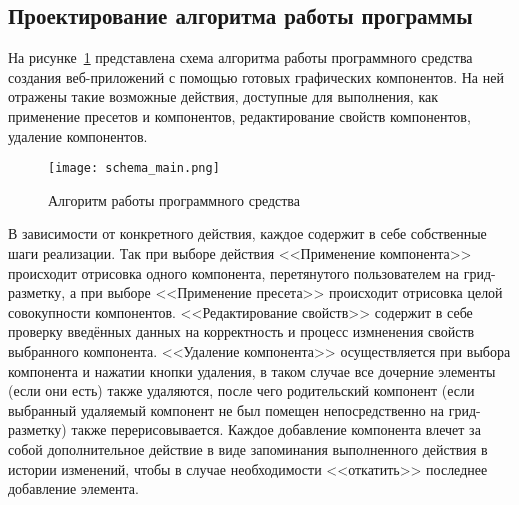 \subsection{Проектирование алгоритма работы программы}
\label{sec:design:algorithm}

На рисунке~\ref{sec:design:main_algorithm_scheme} представлена схема алгоритма работы программного средства создания веб-приложений с помощью готовых графических компонентов. 
На ней отражены такие возможные действия, доступные для выполнения, как применение пресетов и компонентов, редактирование свойств компонентов, удаление компонентов. 

\begin{figure}[ht]
\centering
    \texttt{[image: schema\_main.png]}
    \caption{Алгоритм работы программного средства}
    \label{sec:design:main_algorithm_scheme}
\end{figure}
    
В зависимости от конкретного действия, каждое содержит в себе собственные шаги реализации. 
Так при выборе действия <<Применение компонента>> происходит отрисовка одного компонента, перетянутого пользователем на грид-разметку, а при выборе <<Применение пресета>> происходит отрисовка целой совокупности компонентов. <<Редактирование свойств>> содержит в себе проверку введённых данных на корректность и процесс измненения свойств выбранного компонента. <<Удаление компонента>> осуществляется при выбора компонента и нажатии кнопки удаления, в таком случае все дочерние элементы (если они есть) также удаляются, после чего родительский компонент (если выбранный удаляемый компонент не был помещен непосредственно на грид-разметку) также перерисовывается. Каждое добавление компонента влечет за собой дополнительное действие в виде запоминания выполненного действия в истории изменений, чтобы в случае необходимости <<откатить>> последнее добавление элемента.

